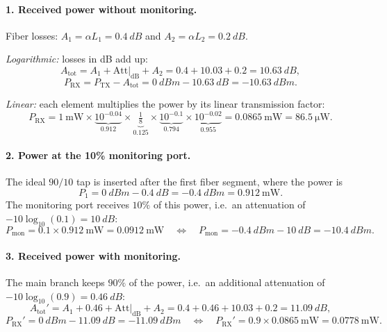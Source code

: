 \paragraph{1. Received power without monitoring.}
Fiber losses: $A_1 = \alpha L_1 = \SI{0.4}{dB}$ and $A_2 = \alpha L_2 = \SI{0.2}{dB}$.

\emph{Logarithmic:} losses in dB add up:
\begin{equation}
  A_\mathrm{tot} = A_1 + \mathrm{Att}|_\mathrm{dB} + A_2 = 0.4 + 10.03 + 0.2 = \SI{10.63}{dB},
\end{equation}
\begin{equation}
  P_\mathrm{RX} = P_\mathrm{TX} - A_\mathrm{tot} = \SI{0}{dBm} - \SI{10.63}{dB} = \SI{-10.63}{dBm}.
\end{equation}

\emph{Linear:} each element multiplies the power by its linear transmission factor:
\begin{equation}
  P_\mathrm{RX} = \SI{1}{\milli\watt}\times
  \underbrace{10^{-0.04}}_{0.912}\times
  \underbrace{\tfrac{1}{8}}_{0.125}\times
  \underbrace{10^{-0.1}}_{0.794}\times
  \underbrace{10^{-0.02}}_{0.955}
  = \SI{0.0865}{\milli\watt} = \SI{86.5}{\micro\watt}.
\end{equation}

\paragraph{2. Power at the 10\% monitoring port.}
The ideal $90/10$ tap is inserted after the first fiber segment, where the power is
\begin{equation}
  P_1 = \SI{0}{dBm} - \SI{0.4}{dB} = \SI{-0.4}{dBm} = \SI{0.912}{\milli\watt}.
\end{equation}
The monitoring port receives $10\%$ of this power, i.e.\ an attenuation of
$-10\log_{10}(0.1) = \SI{10}{dB}$:
\begin{equation}
  P_\mathrm{mon} = 0.1\times\SI{0.912}{\milli\watt} = \SI{0.0912}{\milli\watt}
  \quad\Leftrightarrow\quad
  P_\mathrm{mon} = \SI{-0.4}{dBm} - \SI{10}{dB} = \SI{-10.4}{dBm}.
\end{equation}

\paragraph{3. Received power with monitoring.}
The main branch keeps $90\%$ of the power, i.e.\ an additional attenuation of
$-10\log_{10}(0.9) = \SI{0.46}{dB}$:
\begin{equation}
  A_\mathrm{tot}' = A_1 + 0.46 + \mathrm{Att}|_\mathrm{dB} + A_2 = 0.4 + 0.46 + 10.03 + 0.2 = \SI{11.09}{dB},
\end{equation}
\begin{equation}
  P_\mathrm{RX}' = \SI{0}{dBm} - \SI{11.09}{dB} = \SI{-11.09}{dBm}
  \quad\Leftrightarrow\quad
  P_\mathrm{RX}' = 0.9\times\SI{0.0865}{\milli\watt} = \SI{0.0778}{\milli\watt}.
\end{equation}

